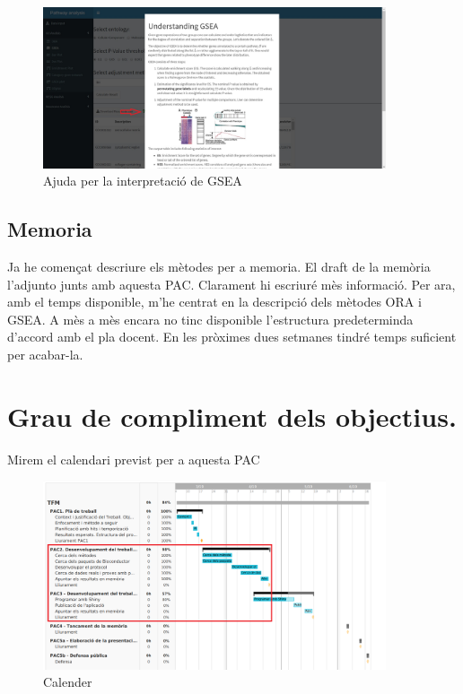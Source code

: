 \documentclass[]{article}
\begin{document}
\begin{figure}[H]
\centering
\includegraphics[width=0.9\textwidth]{Help_GSEA_output.jpg} 
\caption{Ajuda per la interpretació de GSEA}
\end{figure}

\subsection{Memoria}
Ja he començat descriure els mètodes per a memoria.  El draft de la memòria l'adjunto junts amb aquesta PAC. Clarament hi escriuré mès informació. Per ara, amb el temps disponible, m'he centrat en la descripció dels mètodes ORA i GSEA. A mès a mès encara no tinc disponible l'estructura predeterminda d'accord amb el pla docent. En les pròximes dues setmanes tindré temps suficient per acabar-la.

\section{Grau de compliment dels objectius.}
Mirem el calendari previst per a aquesta PAC
\begin{figure}[H]
\centering
\includegraphics[width=0.9\textwidth]{Calender.png} 
\caption{Calender}
\end{figure}
\end{document}
